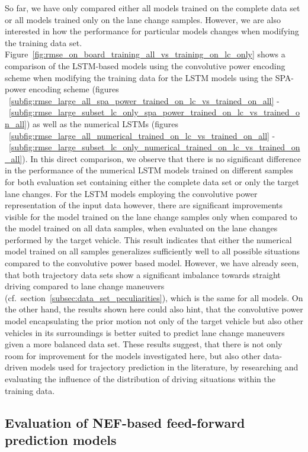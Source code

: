 So far, we have only compared either all models trained on the complete data set or all models trained only on the lane change samples.
However, we are also interested in how the performance for particular models changes when modifying the training data set.
Figure~\ref{fig:rmse_on_board_training_all_vs_training_on_lc_only} shows a comparison of the \ac{LSTM}-based models using the convolutive power encoding scheme when modifying the training data for the \ac{LSTM} models using the \ac{SPA}-power encoding scheme (figures ~\ref{subfig:rmse_large_all_spa_power_trained_on_lc_vs_trained_on_all} - ~\ref{subfig:rmse_large_subset_lc_only_spa_power_trained_on_lc_vs_trained_on_all}) as well as the numerical \acp{LSTM} (figures
~\ref{subfig:rmse_large_all_numerical_trained_on_lc_vs_trained_on_all} -~\ref{subfig:rmse_large_subset_lc_only_numerical_trained_on_lc_vs_trained_on_all}).
In this direct comparison, we observe that there is no significant difference in the performance of the numerical \ac{LSTM} models trained on different samples for both evaluation set containing either the complete data set or only the target lane changes.
For the \ac{LSTM} models employing the convolutive power representation of the input data however, there are significant improvements visible for the model trained on the lane change samples only when compared to the model trained on all data samples, when evaluated on the lane changes performed by the target vehicle.
This result indicates that either the numerical model trained on all samples generalizes sufficiently well to all possible situations compared to the convolutive power based model.
However, we have already seen, that both trajectory data sets show a significant imbalance towards straight driving compared to lane change maneuvers (cf.\ section~\ref{subsec:data_set_peculiarities}), which is the same for all models.
On the other hand, the results shown here could also hint, that the convolutive power model encapsulating the prior motion not only of the target vehicle but also other vehicles in its surroundings is better suited to predict lane change maneuvers given a more balanced data set.
These results suggest, that there is not only room for improvement for the models investigated here, but also other data-driven models used for trajectory prediction in the literature, by researching and evaluating the influence of the distribution of driving situations within the training data.

\subsection{Evaluation of \acs{NEF}-based feed-forward prediction models}%
\label{subsec:evaluation_of_nef_based_feed_forward_prediction_models}

